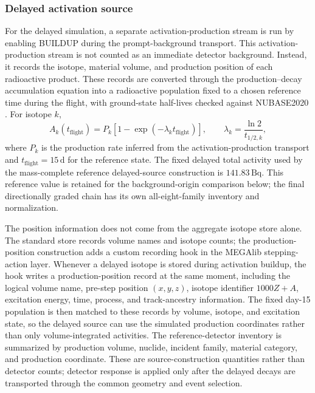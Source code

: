\documentclass[11pt]{article}
\begin{document}
\subsubsection{Delayed activation source}
\label{subsec:delayed_source}

For the delayed simulation, a separate activation-production stream is run by
enabling BUILDUP during the prompt-background transport. This
activation-production stream is not counted as an immediate detector background.
Instead, it records the isotope, material volume, and production position of
each radioactive product. These records are converted through the
production--decay accumulation equation into a radioactive population fixed to a
chosen reference time during the flight, with ground-state half-lives checked
against NUBASE2020 \cite{Kondev2021NUBASE}. For isotope $k$,
\begin{equation}
  A_k(t_{\mathrm{flight}}) = P_k\left[1-\exp\left(-\lambda_k t_{\mathrm{flight}}\right)\right],
  \qquad \lambda_k = \frac{\ln 2}{t_{1/2,k}},
\end{equation}
where $P_k$ is the production rate inferred from the activation-production
transport and $t_{\mathrm{flight}}=15\,\mathrm{d}$ for the reference state.
The fixed delayed total activity used by the mass-complete reference
delayed-source construction is $141.83\,\mathrm{Bq}$. This reference value is
retained for the background-origin comparison below; the final directionally graded chain has
its own all-eight-family inventory and normalization.

The position information does not come from the aggregate isotope store alone.
The standard store records volume names and isotope counts; the
production-position construction adds a custom recording hook in the MEGAlib
stepping-action layer. Whenever a delayed isotope is stored during activation
buildup, the hook writes a production-position record at the same moment,
including the logical volume name, pre-step position $(x,y,z)$, isotope
identifier $1000Z+A$, excitation energy, time, process, and track-ancestry
information. The fixed day-15 population is then matched to these records by
volume, isotope, and excitation state, so the delayed source can use the
simulated production coordinates rather than only volume-integrated activities.
The reference-detector inventory is summarized by production volume, nuclide,
incident family, material category, and production coordinate. These are
source-construction quantities rather than detector counts; detector response is
applied only after the delayed decays are transported through the common geometry
and event selection.
\end{document}
